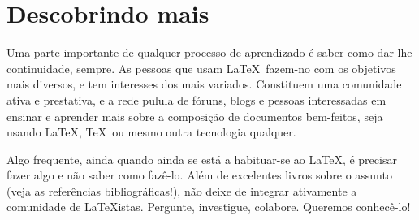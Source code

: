 \section{Descobrindo mais}

Uma parte importante de qualquer processo de aprendizado é saber como
dar-lhe continuidade, sempre. As pessoas que usam \LaTeX\ fazem-no com
os objetivos mais diversos, e tem interesses dos mais
variados. Constituem uma comunidade ativa e prestativa, e a rede
pulula de fóruns, blogs e pessoas interessadas em ensinar e aprender
mais sobre a composição de documentos bem-feitos, seja usando \LaTeX,
\TeX\ ou mesmo outra tecnologia qualquer.

Algo frequente, ainda quando ainda se está a habituar-se ao \LaTeX, é
precisar fazer algo e não saber como fazê-lo. Além de excelentes
livros sobre o assunto (veja as referências bibliográficas!), não
deixe de integrar ativamente a comunidade de \LaTeX istas. Pergunte,
investigue, colabore. Queremos conhecê-lo!

